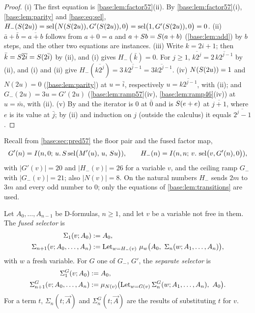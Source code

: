 \begin{proof}
(i) The first equation is \cref{base:lem:factor57}(ii).  By
\cref{base:lem:factor57}(i), \cref{base:lem:parity} and
\eqref{base:eq:sel},
$H_-(S(2u))=\operatorname{sel}\bigl(N(S(2u)),G'(S(2u)),0\bigr)
 =\operatorname{sel}\bigl(1,G'(S(2u)),0\bigr)=0$.
(ii) $\bar a+\bar b=\overline{a+b}$ follows from $a+0=a$ and
$a+S b=S(a+b)$ (\cref{base:lem:add}) by $b$ steps, and the other two
equations are instances.
(iii) Write $k=2i+1$; then $\bar k=S\overline{2i}=S(2\bar i)$ by (ii),
and (i) gives $H_-(\bar k)=0$.  For $j\ge1$,
$\overline{k2^j}=2\,\overline{k2^{j-1}}$ by (ii), and (i) and (ii) give
$H_-(\overline{k2^j})=3\,\overline{k2^{j-1}}=\overline{3k2^{j-1}}$.
(iv) $N(S(2u))=1$ and $N(2u)=0$ (\cref{base:lem:parity}) at
$u=\bar i$, respectively $u=\overline{k2^{j-1}}$, with (ii); and
$G_-(2u)=3u=G'(2u)$ (\cref{base:lem:ramp57}(iv), \cref{base:lem:ramp46}(iv))
at $u=\bar m$, with (ii).
(v) By  and  the iterator is $0$ at $\bar 0$ and is
$S(e+e)$ at $\overline{j+1}$, where $e$ is its value at $\bar j$; by (ii)
and induction on $j$ (outside the calculus) it equals $\overline{2^j-1}$.
\end{proof}

Recall from \cref{base:sec:pred57} the floor pair and the fused factor map,
\[
 G'(n)=I(n,0;\,u.\,S\operatorname{sel}\bigl(M'(u),\,u,\,S u\bigr)),\qquad
 H_-(n)=I(n,n;\,v.\,\operatorname{sel}\bigl(v,G'(n),0\bigr)),
\]
with $|G'(v)|=20$ and $|H_-(v)|=26$ for a variable $v$, and the ceiling ramp
$G_-$ with $|G_-(v)|=21$; also $|N(v)|=8$.  On the natural numbers $H_-$
sends $2m$ to $3m$ and every odd number to $0$; only the equations of
\cref{base:lem:transitions} are used.

\begin{definition}
\label{base:def:fused}
Let $A_0,\dots,A_{n-1}$ be D-formulas, $n\ge 1$, and let $v$ be a variable
not free in them.  The \emph{fused selector} is
\begin{align*}
 \Sigma_1(v;A_0)&\mathrel{:=} A_0,\\
 \Sigma_{n+1}(v;A_0,\dots,A_n)&\mathrel{:=}
  \operatorname{Let}_{w=H_-(v)}\,
  \mu_w\bigl(A_0,\ \Sigma_n(w;A_1,\dots,A_n)\bigr),
\end{align*}
with $w$ a fresh variable.  For $G$ one of $G_-$, $G'$, the \emph{separate
selector} is
\begin{align*}
 \Sigma^{G}_1(v;A_0)&\defeq A_0,\\
 \Sigma^{G}_{n+1}(v;A_0,\dots,A_n)&\defeq
  \mu_{N(v)}\bigl(\operatorname{Let}_{w=G(v)}\Sigma^{G}_n(w;A_1,\dots,A_n),\ A_0\bigr).
\end{align*}
For a term $t$, $\Sigma_n(t;\vec A)$ and $\Sigma^{G}_n(t;\vec A)$ are the
results of substituting $t$ for $v$.
\end{definition}

